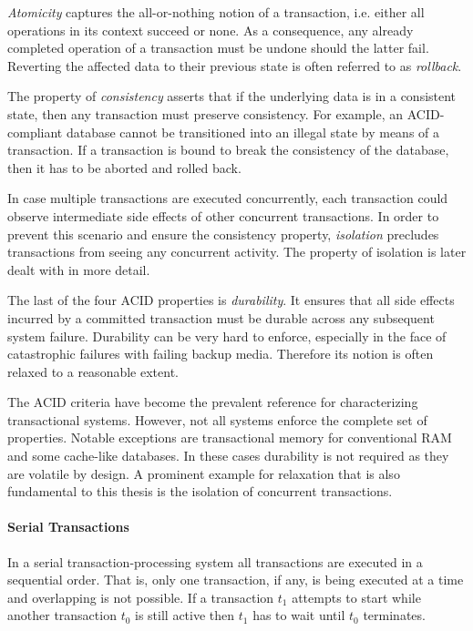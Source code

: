 \emph{Atomicity} captures the all-or-nothing notion of a transaction, i.e.
either all operations in its context succeed or none. As a consequence, any
already completed operation of a transaction must be undone should the latter
fail. Reverting the affected data to their previous state is often referred to
as \emph{rollback}.

The property of \emph{consistency} asserts that if the underlying data is in a
consistent state, then any transaction must preserve consistency. For example,
an ACID-compliant database cannot be transitioned into an illegal state by means
of a transaction. If  a transaction is bound to break the consistency of the
database, then it has to be aborted and rolled back.

In case multiple transactions are executed concurrently, each transaction could
observe intermediate side effects of other concurrent transactions. In order to
prevent this scenario and ensure the consistency property, \emph{isolation}
precludes transactions from seeing any concurrent activity. The property of
isolation is later dealt with in more detail.

The last of the four ACID properties is \emph{durability}. It ensures that all
side effects incurred by a committed transaction must be durable across any
subsequent system failure. Durability can be very hard to enforce, especially in
the face of catastrophic failures with failing backup media. Therefore its notion
is often relaxed to a reasonable extent.

The ACID criteria have become the prevalent reference for characterizing
transactional systems. However, not all systems enforce the complete set of
properties. Notable exceptions are transactional memory for conventional
\ac{RAM} and some cache-like databases. In these cases durability is not
required as they are volatile by design. A prominent example for relaxation that
is also fundamental to this thesis is the isolation of concurrent transactions.

\paragraph{Serial Transactions}

In a serial transaction-processing system all transactions are executed in a
sequential order. That is, only one transaction, if any, is being executed at a
time and overlapping is not possible. If a transaction $t_1$ attempts to start
while another transaction $t_0$ is still active then $t_1$ has to wait until
$t_0$ terminates.


